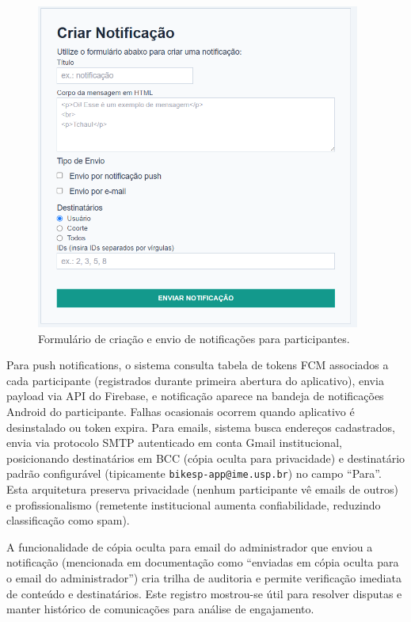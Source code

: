  \begin{figure}[htb]
   \centering
   \includegraphics[width=0.95\textwidth]{figuras/notificacao_criar.PNG}
   \caption{Formulário de criação e envio de notificações para participantes.}
   \label{fig:notificacao_criar}
 \end{figure}

Para push notifications, o sistema consulta tabela de tokens FCM associados a cada participante (registrados durante primeira abertura do aplicativo), envia payload via API do Firebase, e notificação aparece na bandeja de notificações Android do participante. Falhas ocasionais ocorrem quando aplicativo é desinstalado ou token expira. Para emails, sistema busca endereços cadastrados, envia via protocolo SMTP autenticado em conta Gmail institucional, posicionando destinatários em BCC (cópia oculta para privacidade) e destinatário padrão configurável (tipicamente \texttt{bikesp-app@ime.usp.br}) no campo ``Para''. Esta arquitetura preserva privacidade (nenhum participante vê emails de outros) e profissionalismo (remetente institucional aumenta confiabilidade, reduzindo classificação como spam).

A funcionalidade de cópia oculta para email do administrador que enviou a notificação (mencionada em documentação como ``enviadas em cópia oculta para o email do administrador'') cria trilha de auditoria e permite verificação imediata de conteúdo e destinatários. Este registro mostrou-se útil para resolver disputas e manter histórico de comunicações para análise de engajamento.

